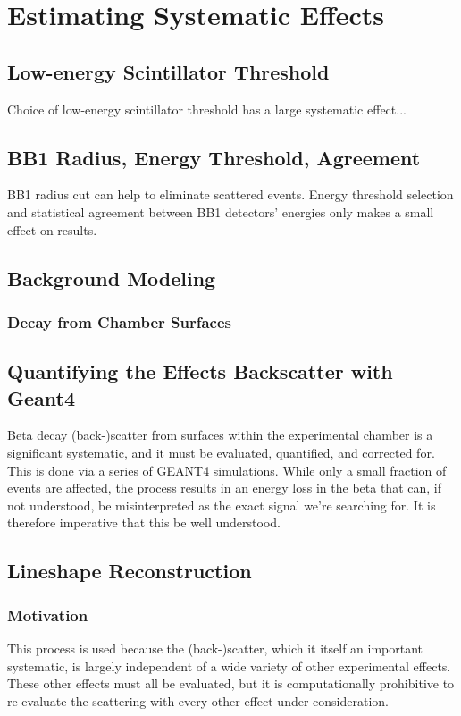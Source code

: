 \chapter{Estimating Systematic Effects}
	\section{Low-energy Scintillator Threshold}
	Choice of low-energy scintillator threshold has a large systematic effect...  
	
	\section{BB1 Radius, Energy Threshold, Agreement}
	BB1 radius cut can help to eliminate scattered events.  Energy threshold selection and statistical agreement between BB1 detectors' energies only makes a small effect on results.  

\section{Background Modeling}
	\subsection{Decay from Chamber Surfaces}

\section{Quantifying the Effects Backscatter with Geant4}
	Beta decay (back-)scatter from surfaces within the experimental chamber is a significant systematic, and it must be evaluated, quantified, and corrected for.  This is done via a series of GEANT4 simulations.  While only a small fraction of events are affected, the process results in an energy loss in the beta that can, if not understood, be misinterpreted as the exact signal we're searching for.  It is therefore imperative that this be well understood. 

\section{Lineshape Reconstruction}
	\subsection{Motivation}
	This process is used because the (back-)scatter, which it itself an important systematic, is largely independent of a wide variety of other experimental effects.  These other effects must all be evaluated, but it is computationally prohibitive to re-evaluate the scattering with every other effect under consideration.
	
